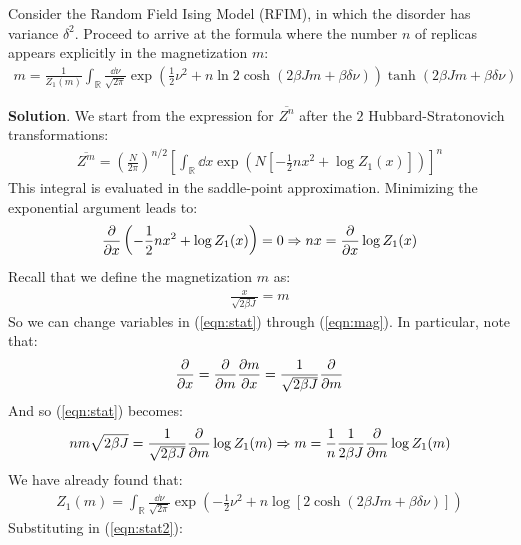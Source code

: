 \documentclass[../template.tex]{subfiles}
\begin{document}
\begin{exo}
    Consider the Random Field Ising Model (RFIM), in which the disorder has variance $\delta^2$. Proceed to arrive at the formula where the number $n$ of replicas appears explicitly in the magnetization $m$:
    \begin{align*}
        m = \frac{1}{Z_1(m)} \int_{\mathbb{R}} \frac{\dd{\nu}}{\sqrt{2 \pi}} \exp\left(\frac{1}{2} \nu^2 + n\ln 2 \cosh(2 \beta J m + \beta \delta \nu)  \right)   \tanh(2 \beta Jm + \beta \delta \nu)
    \end{align*}

    \medskip

    \textbf{Solution}. 
    We start from the expression for $\overline{Z^n}$ after the $2$ Hubbard-Stratonovich transformations:
    \begin{align}\label{eqn:stat}
        \overline{Z^m} = \left(\frac{N}{2\pi} \right)^{n/2} \left[\int_{\mathbb{R}} \dd{x} \exp\left(N \left[-\frac{1}{2} n x^2 + \log Z_1(x) \right]\right)\right]^n
    \end{align}
    This integral is evaluated in the saddle-point approximation. Minimizing the exponential argument leads to:
    \begin{align}\label{eqn:mag}
        \pdv{x} \left(-\frac{1}{2} n x^2 + \log Z_1(x) \right) = 0 \Rightarrow n x = \pdv{x} \log Z_1(x)
    \end{align}
    Recall that we define the magnetization $m$ as:
    \begin{align*}
        \frac{x}{\sqrt{2 \beta J}} = m
    \end{align*}
    So we can change variables in (\ref{eqn:stat}) through (\ref{eqn:mag}). In particular, note that:
    \begin{align*}
        \pdv{x} = \pdv{m} \pdv{m}{x} = \frac{1}{\sqrt{2 \beta J}}  \pdv{m}
    \end{align*}
    And so (\ref{eqn:stat}) becomes:
    \begin{align} \label{eqn:stat2}
        n m \sqrt{2 \beta J} = \frac{1}{\sqrt{2 \beta J}}  \pdv{m} \log Z_1(m) \Rightarrow m = \frac{1}{n} \frac{1}{2 \beta J} \pdv{m} \log Z_1(m)  
    \end{align}
    We have already found that:
    \begin{align*}
        Z_1(m) = \int_{\mathbb{R}} \frac{\dd{\nu}}{\sqrt{2 \pi}}  \exp\left(-\frac{1}{2} \nu^2 + n\log[2 \cosh(2 \beta J m + \beta \delta \nu)] \right)
    \end{align*}
    Substituting in (\ref{eqn:stat2}):

\end{exo}
\end{document}
